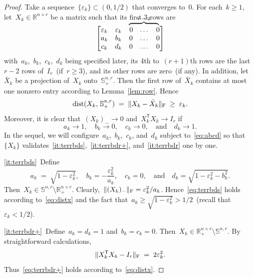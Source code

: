 \documentclass[11pt,a4paper]{article}  %
\newcommand\overmat[2]{%
\makebox[1pt][l]{$\smash{\overbrace{\phantom{\begin{matrix}#2\end{matrix}}}^{\text{$#1$}}}$}#2}
\theoremstyle{definition}
\DeclareMathOperator{\dist}{dist}
\newcommand{\RR}{\mathbb{R}}
\newcommand{\col}{r}
\newcommand{\stf}[1]{\mathbb{S}^{#1}}
\newcommand{\fro}{{\scriptstyle{\textnormal{F}}}}
\newcommand{\trs}{{\scriptstyle{\mathsf{T}}}}
\begin{document}
\begin{proof}
    Take a sequence~$\{\varepsilon_k\}\subset (0,1/2)$ that converges to~$0$.
    For each~$k \ge 1$, let~$X_k\in\RR^{n\times \col}$ be a matrix such that its first 3 rows are
    \vspace{9pt}
  \begin{equation}
        \nonumber
 \begin{bmatrix}
           \varepsilon_k & \varepsilon_k& \overmat{\col-2}{0 & \dots  & 0}\\
            a_k & b_k & 0 & \dots  & 0 \\
            c_k & d_k & 0 & \dots  & 0
        \end{bmatrix}
    \end{equation}
    with~$a_k$,~$b_k$,~$c_k$,~$d_k$ being specified later,
    its 4th to~$(\col+1)$th rows are the last~$\col-2$ rows of~$I_\col$~(if~$\col \ge 3$), and its other
    rows are zero~(if any).
    In addition, let~$\bar{X}_k$ be a projection of~$X_k$ onto~$\stf{n,\col}_+$. Then the first
    row of~$\bar{X}_k$ contains at most one nonzero entry according to Lemma~\ref{lem:row}. Hence
    \begin{equation}
        \label{eq:distx}
        \dist(X_k,\,\stf{n,\col}_+) \;=\; \|X_k - \bar{X}_k\|_\fro \;\ge\; \varepsilon_k.
    \end{equation}
    Moreover, it is clear that~$(X_k)_{-}\to 0$ and~$X_k^\trs X_k \to I_\col$ if
    \begin{equation}
        \label{eq:abcd}
        a_k \to 1, \quad b_k \to 0, \quad c_k \to 0, \quad \text{and} \quad d_k\to 1.
    \end{equation}
    In the sequel, we will configure~$a_k$,~$b_k$,~$c_k$, and~$d_k$ subject to~\eqref{eq:abcd}
    so that~$\{X_k\}$ validates~\ref{it:terrbds},~\ref{it:terrbdr+}, and~\ref{it:terrbdr} one by one.

    \ref{it:terrbds}~Define
\begin{equation}
    \nonumber
    a_k \;=\; \sqrt{1-\varepsilon_k^2}, \quad b_k = -\frac{\varepsilon_k^2}{a_k}, \quad c_k = 0,
    \quad \text{and} \quad d_k = \sqrt{1-\varepsilon_k^2 - b_k^2}.
\end{equation}
Then~$X_k\in \stf{n,\col}\setminus\RR^{n\times \col}_+$.
Clearly,~$\|(X_{k})_{-}\|_\fro = {\varepsilon_k^2}/{a_k}$.
    Hence~\eqref{eq:terrbds} holds according to~\eqref{eq:distx} and the fact that~$a_k \ge
    \sqrt{1-\varepsilon_k^2} > 1/2$~(recall that~$\varepsilon_k <1/2$).

    \ref{it:terrbdr+}~Define~$a_k = d_k = 1$ and~$b_k = c_k = 0$. Then~$X_k\in \RR^{n\times \col}_+
    \setminus\stf{n,\col}$. By straightforward calculations,
\begin{equation}
    \nonumber
       \|X_k^\trs X_k - I_\col\|_{\fro} \;=\; 2\varepsilon_k^2.
\end{equation}
Thus~\eqref{eq:terrbdr+} holds according to~\eqref{eq:distx}.


\end{proof}
\end{document}
